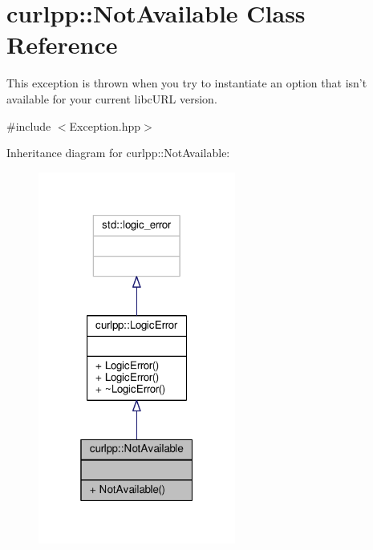 \hypertarget{classcurlpp_1_1NotAvailable}{\section{curlpp\-:\-:Not\-Available Class Reference}
\label{classcurlpp_1_1NotAvailable}
}


This exception is thrown when you try to instantiate an option that isn't available for your current libc\-U\-R\-L version.  




{\ttfamily \#include $<$Exception.\-hpp$>$}



Inheritance diagram for curlpp\-:\-:Not\-Available\-:\nopagebreak
\begin{figure}[H]
\begin{center}
\leavevmode
\includegraphics[width=184pt]{classcurlpp_1_1NotAvailable__inherit__graph}
\end{center}
\end{figure}


